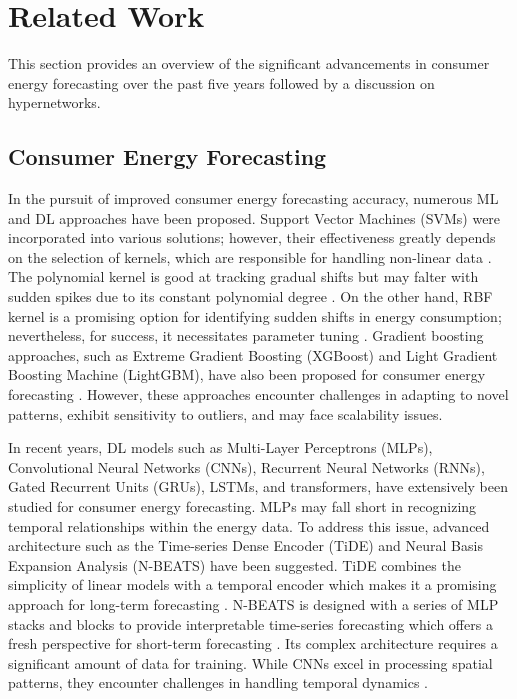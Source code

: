 \section{Related Work}
\label{sec:relwork}
This section provides an overview of the significant advancements in {consumer energy} forecasting over the past five years followed by a discussion on hypernetworks. 

\subsection{ {Consumer Energy} Forecasting}
In the pursuit of improved {consumer energy} forecasting accuracy, numerous ML and DL approaches have been proposed. Support Vector Machines (SVMs) were incorporated into various solutions; however, their effectiveness greatly depends on the selection of kernels, which are responsible for handling non-linear data \cite{zhang2018forecasting}. The polynomial kernel is good at tracking gradual shifts but may falter with sudden spikes due to its constant polynomial degree \cite{madhukumar2022regression}. On the other hand, RBF kernel is a promising option for identifying sudden shifts in energy consumption; nevertheless, for success, it necessitates parameter tuning \cite{madhukumar2022regression}. Gradient boosting approaches, such as Extreme Gradient Boosting (XGBoost) and Light Gradient Boosting Machine (LightGBM), have also been proposed for {consumer energy} forecasting {\cite{ni2024light}}. However, these approaches encounter challenges in adapting to novel patterns, exhibit sensitivity to outliers, and may face scalability issues.

In recent years, DL models such as Multi-Layer Perceptrons (MLPs), Convolutional Neural Networks (CNNs), Recurrent Neural Networks (RNNs), Gated Recurrent Units (GRUs), LSTMs, and transformers, have extensively been studied for {consumer energy} forecasting. MLPs may fall short in recognizing temporal relationships within the energy data. To address this issue, advanced architecture such as the Time-series Dense Encoder (TiDE) \cite{das2023long} and Neural Basis Expansion Analysis (N-BEATS) \cite{oreshkin2021n} have been suggested. TiDE combines the simplicity of linear models with a temporal encoder which makes it a promising approach for long-term forecasting \cite{das2023long}. N-BEATS is designed with a series of MLP stacks and blocks to provide interpretable time-series forecasting which offers a fresh perspective for short-term forecasting \cite{oreshkin2021n}. Its complex architecture requires a significant amount of data for training. While CNNs excel in processing spatial patterns, they encounter challenges in handling temporal dynamics \cite{shaikh2023new}.

